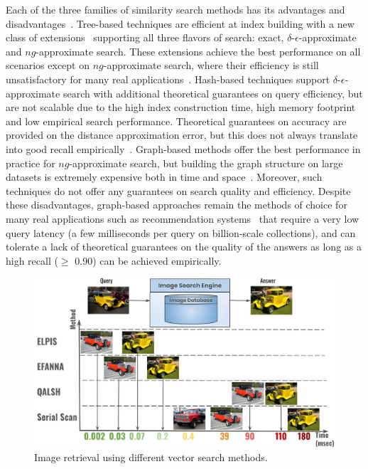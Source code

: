 Each of the three families of similarity search methods has its advantages and disadvantages~\cite{hydra2,elpis}. 
Tree-based techniques are efficient at index building with a new class of extensions~\cite{hydra2} supporting all three flavors of search: exact, $\delta$-$\epsilon$-approximate and $ng$-approximate search. These extensions achieve the best performance on all scenarios except on $ng$-approximate search, where their efficiency is still unsatisfactory for many real applications~\cite{hydra2,hydra1,conf/sigmod/echihabi2020,DBLP:conf/edbt/EchihabiZP21,conf/icde/echihabi2021}. 
Hash-based techniques support $\delta$-$\epsilon$-approximate search with additional theoretical guarantees on query efficiency, but are not scalable due to the high index construction time, high memory footprint and low empirical search performance. 
Theoretical guarantees on accuracy are provided on the distance approximation error, but this does not always translate into good recall empirically~\cite{hydra2,aumuller2017ann,lsh-survey,DBLP:conf/edbt/EchihabiZP21,conf/icde/echihabi2021,qalsh,elpis}. 
Graph-based methods offer the best performance in practice for $ng$-approximate search, but building the graph structure on large datasets is extremely expensive both in time and space~\cite{elpis,aumuller2017ann,conf/sigmod/echihabi2020,hydra2,graph-survey-vldb}. 
Moreover, such techniques do not offer any guarantees on search quality and efficiency. 
Despite these disadvantages, graph-based approaches remain the methods of choice for many real applications such as recommendation systems~\cite{graphrec2,graphrec1,alibabaknngml,DBLP:journals/corr/JohnsonDJ17} that require a very low query latency (a few milliseconds per query on billion-scale collections), and can tolerate a lack of theoretical guarantees on the quality of the answers as long as a high recall ($\ge$ 0.90) can be achieved empirically.  


\begin{figure}[tb] 
\centering
		\captionsetup{justification=centering}
		\includegraphics[width=0.8\columnwidth]{../img/intro/ENDTOENDEXAMPLE2.png}
		\caption{
  Image retrieval using different vector search methods.
  }        
		\label{fig:use_case}
 \end{figure}


